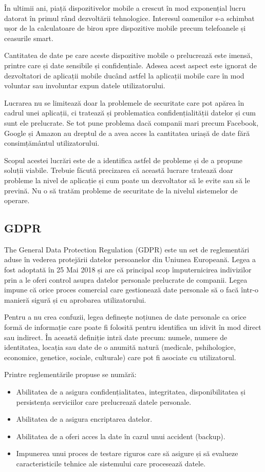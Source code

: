 \documentclass[12pt]{article}
\begin{document}
În ultimii ani, piață dispozitivelor mobile a crescut în mod exponențial lucru datorat în primul
rând dezvoltării tehnologice. Interesul oamenilor s-a schimbat ușor de la calculatoare de birou spre 
dispozitive mobile precum telefoanele și ceasurile smart. 

Cantitatea de date pe care aceste dispozitive mobile o prelucrează este imensă, printre care și date sensibile
și confidențiale. Adesea acest aspect este ignorat de dezvoltatori de aplicații mobile ducând astfel
la aplicații mobile care în mod voluntar sau involuntar expun datele utilizatorului. 

Lucrarea nu se limitează doar la problemele de securitate care pot apărea în cadrul unei aplicații, ci 
tratează și problematica confidențialității datelor și cum sunt ele prelucrate. Se tot pune problema dacă companii mari precum Facebook, Google și Amazon au dreptul de a avea acces la
cantitatea uriașă de date fără consimțământul utilizatorului.

Scopul acestei lucrări este de a identifica astfel de probleme și de a propune soluții viabile.
Trebuie făcută precizarea că această lucrare tratează doar probleme la nivel de aplicație și cum poate
un dezvoltator să le evite sau să le prevină. Nu o să tratăm probleme de securitate de la nivelul sistemelor
de operare.

\newpage

\subsection{GDPR}

The General Data Protection Regulation (GDPR) este un set de reglementări aduse în vederea protejării datelor
persoanelor din Uniunea Europeană. Legea a fost adoptată în 25 Mai 2018 și are că principal scop împuternicirea
indivizilor prin a le oferi control asupra datelor personale prelucrate de companii. Legea impune că 
orice proces comercial care gestionează date personale să o facă într-o manieră sigură și cu aprobarea
utilizatorului.

Pentru a nu crea confuzii, legea definește noțiunea de date personale ca orice formă de informație
care poate fi folosită pentru identifica un idivit în mod direct sau indirect. În această definiție intră
date precum: numele, numere de identitatea, locația sau date de o anumită natură (medicale, pshihologice, 
economice, genetice, sociale, culturale) care pot fi asociate cu utilizatorul.

Printre reglementările propuse se numără:
\begin{itemize}
    \item Abilitatea de a asigura confidențialitatea, integritatea, disponibilitatea și persistența
    serviciilor care prelucrează datele personale.
    \item Abilitatea de a asigura encriptarea datelor.
    \item Abilitatea de a oferi acces la date în cazul unui accident (backup).
    \item Impunerea unui proces de testare riguros care să asigure și să evalueze caracteristicile
    tehnice ale sistemului care procesează datele.
\end{itemize}
\end{document}
